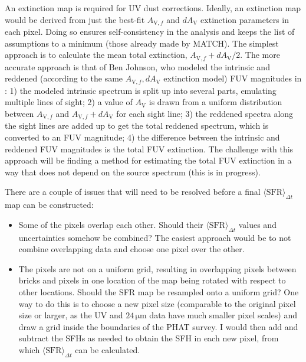 \documentclass[preprint,11pt]{aastex}
\begin{document}
An extinction map is required for UV dust corrections. Ideally, an extinction
map would be derived from just the best-fit $A_{\mathrm{V},f}$ and
$dA_\mathrm{V}$ extinction parameters in each pixel. Doing so ensures
self-consistency in the analysis and keeps the list of assumptions to a minimum
(those already made by MATCH). The simplest approach is to calculate the mean
total extinction, $A_{\mathrm{V},f} + dA_\mathrm{V}/2$. The more accurate
approach is that of Ben Johnson, who modeled the intrinsic and reddened
(according to the same $A_{\mathrm{V},f},dA_\mathrm{V}$ extinction model) FUV
magnitudes in \citet{Simones14}: 1) the modeled intrinsic spectrum is split up
into several parts, emulating multiple lines of sight; 2) a value of
$A_\mathrm{V}$ is drawn from a uniform distribution between $A_{\mathrm{V},f}$
and $A_{\mathrm{V},f} + dA_\mathrm{V}$ for each sight line; 3) the reddened
spectra along the sight lines are added up to get the total reddened spectrum,
which is converted to an FUV magnitude; 4) the difference between the intrinsic
and reddened FUV magnitudes is the total FUV extinction. The challenge with
this approach will be finding a method for estimating the total FUV extinction
in a way that does not depend on the source spectrum (this is in progress).

There are a couple of issues that will need to be resolved before a final
$\langle \mathrm{SFR}\rangle_{\Delta t}$ map can be constructed:
\begin{itemize}
\item Some of the pixels overlap each other. Should their $\langle
    \mathrm{SFR}\rangle_{\Delta t}$ values and uncertainties somehow be
    combined? The easiest approach would be to not combine overlapping data and
    choose one pixel over the other.
\item The pixels are not on a uniform grid, resulting in overlapping pixels
    between bricks and pixels in one location of the map being rotated with
    respect to other locations. Should the SFR map be resampled onto a uniform
    grid? One way to do this is to choose a new pixel size (comparable to the
    original pixel size or larger, as the UV and $24\,\mathrm{\mu m}$ data have
    much smaller pixel scales) and draw a grid inside the boundaries of the
    PHAT survey. I would then add and subtract the SFHs as needed to obtain the
    SFH in each new pixel, from which $\langle \mathrm{SFR}\rangle_{\Delta t}$
    can be calculated.
\end{itemize}
\end{document}
